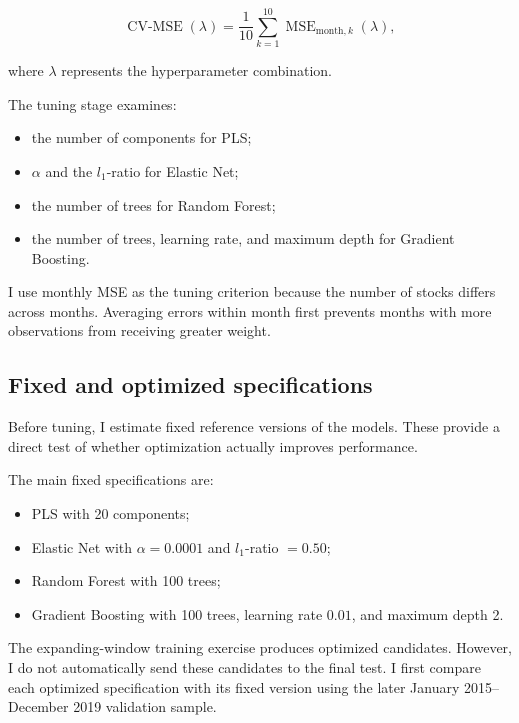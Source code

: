 \documentclass[11pt,a4paper]{article}
\begin{document}
\begin{equation}
 \operatorname{CV\text{-}MSE}(\lambda)
 =
 \frac{1}{10}
 \sum_{k=1}^{10}
 \operatorname{MSE}_{\mathrm{month},k}(\lambda),
 \label{eq:cv-mse}
\end{equation}

where \(\lambda\) represents the hyperparameter combination.

The tuning stage examines:

\begin{itemize}
  \item the number of components for PLS;
  \item \(\alpha\) and the \(l_1\)-ratio for Elastic Net;
  \item the number of trees for Random Forest;
  \item the number of trees, learning rate, and maximum depth for Gradient
        Boosting.
\end{itemize}

I use monthly MSE as the tuning criterion because the number of stocks differs
across months. Averaging errors within month first prevents months with more
observations from receiving greater weight.

\subsection{Fixed and optimized specifications}

Before tuning, I estimate fixed reference versions of the models. These provide
a direct test of whether optimization actually improves performance.

The main fixed specifications are:

\begin{itemize}
  \item PLS with 20 components;
  \item Elastic Net with \(\alpha=0.0001\) and \(l_1\)-ratio \(=0.50\);
  \item Random Forest with 100 trees;
  \item Gradient Boosting with 100 trees, learning rate \(0.01\), and maximum
        depth 2.
\end{itemize}

The expanding-window training exercise produces optimized candidates. However,
I do not automatically send these candidates to the final test. I first compare
each optimized specification with its fixed version using the later
January 2015--December 2019 validation sample.
\end{document}
